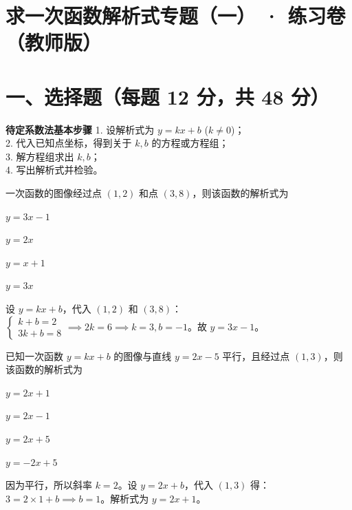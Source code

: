 \documentclass{exam-zh}
\begin{document}
\section*{求一次函数解析式专题（一） · 练习卷（教师版）}

\section*{一、选择题（每题 12 分，共 48 分）}


\begin{keyideabox}
  \textbf{待定系数法基本步骤}
  1. 设解析式为 $y=kx+b$ ($k\neq0$)；\\ 2. 代入已知点坐标，得到关于 $k, b$ 的方程或方程组；\\ 3. 解方程组求出 $k, b$；\\ 4. 写出解析式并检验。
\end{keyideabox}



\begin{question}[points=12]
  一次函数的图像经过点 $(1, 2)$ 和点 $(3, 8)$，则该函数的解析式为
  \begin{choices}
    \item $y = 3x - 1$
    \item $y = 2x$
    \item $y = x + 1$
    \item $y = 3x$
  \end{choices}
  \paren[A]
  \begin{solutionblock}
    设 $y = kx+b$，代入 $(1,2)$ 和 $(3,8)$：\\ $\begin{cases} k+b=2 \\ 3k+b=8 \end{cases} \implies 2k=6 \implies k=3, b=-1$。故 $y=3x-1$。
  \end{solutionblock}
\end{question}



\begin{question}[points=12]
  已知一次函数 $y = kx + b$ 的图像与直线 $y = 2x - 5$ 平行，且经过点 $(1, 3)$，则该函数的解析式为
  \begin{choices}
    \item $y = 2x + 1$
    \item $y = 2x - 1$
    \item $y = 2x + 5$
    \item $y = -2x + 5$
  \end{choices}
  \paren[A]
  \begin{solutionblock}
    因为平行，所以斜率 $k = 2$。设 $y = 2x + b$，代入 $(1,3)$ 得：$3 = 2 \times 1 + b \implies b = 1$。解析式为 $y = 2x + 1$。
  \end{solutionblock}
\end{question}
\end{document}
